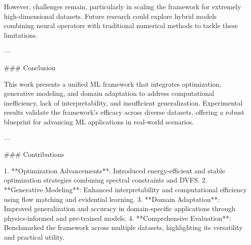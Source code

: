 However, challenges remain, particularly in scaling the framework for extremely high-dimensional datasets. Future research could explore hybrid models combining neural operators with traditional numerical methods to tackle these limitations.

---

### Conclusion

This work presents a unified ML framework that integrates optimization, generative modeling, and domain adaptation to address computational inefficiency, lack of interpretability, and insufficient generalization. Experimental results validate the framework's efficacy across diverse datasets, offering a robust blueprint for advancing ML applications in real-world scenarios.

---

### Contributions

1. **Optimization Advancements**: Introduced energy-efficient and stable optimization strategies combining spectral constraints and DVFS.
2. **Generative Modeling**: Enhanced interpretability and computational efficiency using flow matching and evidential learning.
3. **Domain Adaptation**: Improved generalization and accuracy in domain-specific applications through physics-informed and pre-trained models.
4. **Comprehensive Evaluation**: Benchmarked the framework across multiple datasets, highlighting its versatility and practical utility.